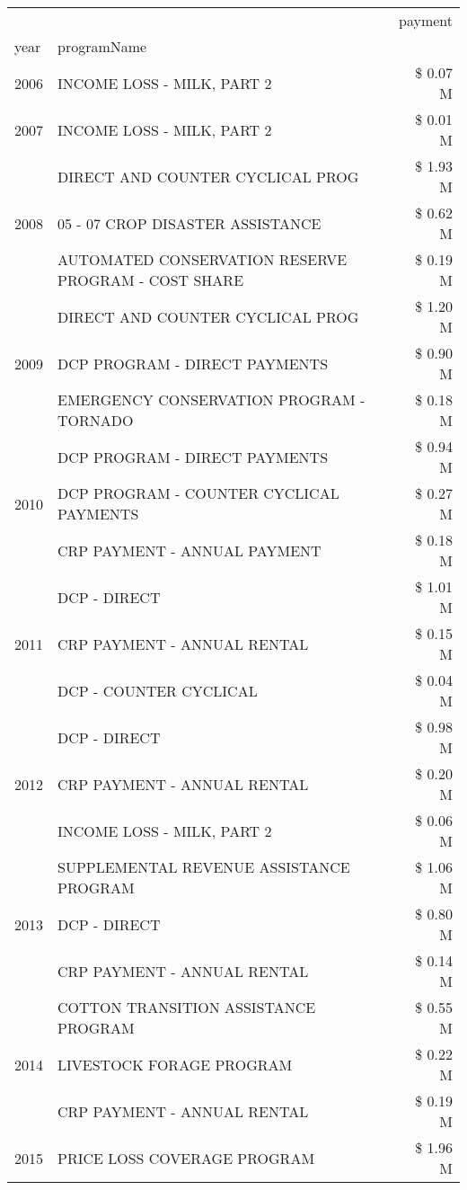 \begin{tabular}{llr}
\toprule
 &  & payment \\
year & programName &  \\
\midrule
2006 & INCOME LOSS - MILK, PART 2 & \$ 0.07 M \\
\cline{1-3}
2007 & INCOME LOSS - MILK, PART 2 & \$ 0.01 M \\
\cline{1-3}
\multirow[t]{3}{*}{2008} & DIRECT AND COUNTER CYCLICAL PROG & \$ 1.93 M \\
 & 05 - 07 CROP DISASTER ASSISTANCE & \$ 0.62 M \\
 & AUTOMATED CONSERVATION RESERVE PROGRAM - COST SHARE & \$ 0.19 M \\
\cline{1-3}
\multirow[t]{3}{*}{2009} & DIRECT AND COUNTER CYCLICAL PROG & \$ 1.20 M \\
 & DCP PROGRAM - DIRECT PAYMENTS & \$ 0.90 M \\
 & EMERGENCY CONSERVATION PROGRAM - TORNADO & \$ 0.18 M \\
\cline{1-3}
\multirow[t]{3}{*}{2010} & DCP PROGRAM - DIRECT PAYMENTS & \$ 0.94 M \\
 & DCP PROGRAM - COUNTER CYCLICAL PAYMENTS & \$ 0.27 M \\
 & CRP PAYMENT - ANNUAL PAYMENT & \$ 0.18 M \\
\cline{1-3}
\multirow[t]{3}{*}{2011} & DCP - DIRECT & \$ 1.01 M \\
 & CRP PAYMENT - ANNUAL RENTAL & \$ 0.15 M \\
 & DCP - COUNTER CYCLICAL & \$ 0.04 M \\
\cline{1-3}
\multirow[t]{3}{*}{2012} & DCP - DIRECT & \$ 0.98 M \\
 & CRP PAYMENT - ANNUAL RENTAL & \$ 0.20 M \\
 & INCOME LOSS - MILK, PART 2 & \$ 0.06 M \\
\cline{1-3}
\multirow[t]{3}{*}{2013} & SUPPLEMENTAL REVENUE ASSISTANCE PROGRAM & \$ 1.06 M \\
 & DCP - DIRECT & \$ 0.80 M \\
 & CRP PAYMENT - ANNUAL RENTAL & \$ 0.14 M \\
\cline{1-3}
\multirow[t]{3}{*}{2014} & COTTON TRANSITION ASSISTANCE PROGRAM & \$ 0.55 M \\
 & LIVESTOCK FORAGE PROGRAM & \$ 0.22 M \\
 & CRP PAYMENT - ANNUAL RENTAL & \$ 0.19 M \\
\cline{1-3}
\multirow[t]{3}{*}{2015} & PRICE LOSS COVERAGE PROGRAM & \$ 1.96 M \\

\end{tabular}
